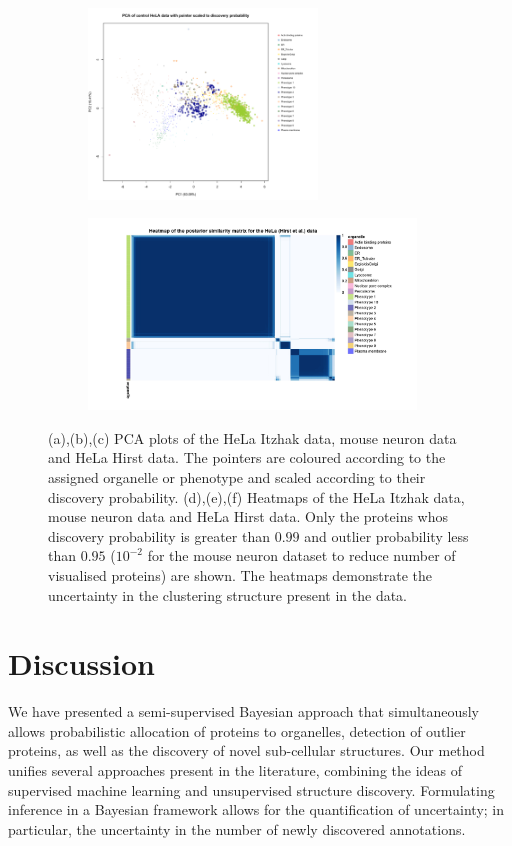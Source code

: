 \documentclass[12pt,english]{article}
\begin{document}
\begin{figure}
\begin{subfigure}[t]{0.5\textwidth}
		\caption{}
	\end{subfigure}
	~
	\begin{subfigure}[t]{0.5\textwidth}
		\centering
		\includegraphics[height=2in]{pcaHirst.pdf}
		\caption{}
	\end{subfigure}
	\begin{subfigure}[t]{0.5\textwidth}
		\centering
		\includegraphics[height=2in]{heatmapHirst.jpg}
		\caption{}
	\end{subfigure}
	\caption{(a),(b),(c) PCA plots of the HeLa Itzhak data, mouse neuron data and HeLa Hirst data. The pointers are coloured according to the assigned organelle or phenotype and scaled according to their discovery probability. (d),(e),(f) Heatmaps of the HeLa Itzhak data, mouse neuron data and HeLa Hirst data. Only the proteins whos discovery probability is greater than $0.99$ and outlier probability less than $0.95$ ($10^{-2}$ for the mouse neuron dataset to reduce number of visualised proteins) are shown. The heatmaps demonstrate the uncertainty in the clustering structure present in the data.}
	\label{figure:DOM}
\end{figure}

\clearpage 
\section{Discussion}
We have presented a semi-supervised Bayesian approach that simultaneously allows probabilistic allocation of proteins to organelles, detection of outlier proteins, as well as the discovery of novel sub-cellular structures. Our method unifies several approaches present in the literature, combining the ideas of supervised machine learning and unsupervised structure discovery. Formulating inference in a Bayesian framework allows for the quantification of uncertainty; in particular, the uncertainty in the number of newly discovered annotations.
\end{document}

